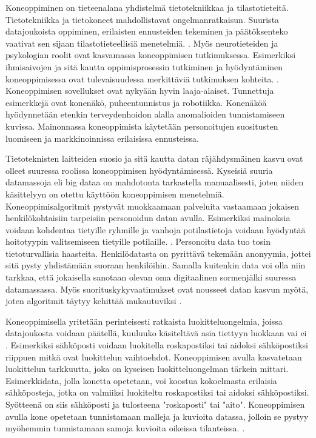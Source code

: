 \documentclass[utf8]{gradu3}
\begin{document}
Koneoppiminen on tieteenalana yhdistelmä tietotekniikkaa ja tilastotieteitä. Tietotekniikka ja tietokoneet mahdollistavat ongelmanratkaisun. Suurista datajoukoista oppiminen, erilaisten ennusteiden tekeminen ja päätöksenteko vaativat sen sijaan tilastotieteellisiä menetelmiä. \parencite{das2017survey,jordan2015machine}. Myös neurotieteiden ja psykologian roolit ovat kasvamassa koneoppimisen tutkimuksessa. Esimerkiksi ihmisaivojen ja sitä kautta oppimisprosessin tutkiminen ja hyödyntäminen koneoppimisessa ovat tulevaisuudessa merkittäviä tutkimuksen kohteita. \parencite{das2017survey}. Koneoppimisen sovellukset ovat nykyään hyvin laaja-alaiset. Tunnettuja esimerkkejä ovat konenäkö, puheentunnistus ja robotiikka. Konenäköä hyödynnetään etenkin terveydenhoidon alalla anomalioiden tunnistamiseen kuvissa. Mainonnassa koneoppimista käytetään personoitujen suositusten luomiseen ja markkinoinnissa erilaisissa ennusteissa.

Tietoteknisten laitteiden suosio ja sitä kautta datan räjähdysmäinen kasvu ovat olleet suuressa roolissa koneoppimisen hyödyntämisessä. Kyseisiä suuria datamassoja eli big dataa on mahdotonta tarkastella manuaalisesti, joten niiden käsittelyyn on otettu käyttöön koneoppimisen menetelmiä. Koneoppimisalgoritmit pystyvät muokkaamaan palveluita vastaamaan jokaisen henkilökohtaisiin tarpeisiin personoidun datan avulla. Esimerkiksi mainoksia voidaan kohdentaa tietyille ryhmille ja vanhoja potilastietoja voidaan hyödyntää hoitotyypin valitsemiseen tietyille potilaille. \parencite{jordan2015machine}. Personoitu data tuo tosin tietoturvallisia haasteita. Henkilödatasta on pyrittävä tekemään anonyymia, jottei sitä pysty yhdistämään suoraan henkilöihin. Samalla kuitenkin data voi olla niin tarkkaa, että jokaisella sanotaan olevan oma digitaalinen sormenjälki suuressa datamassassa. Myös suorituskykyvaatimukset ovat nousseet datan kasvun myötä, joten algoritmit täytyy kehittää mukautuviksi \parencite{jordan2015machine}.

Koneoppimisella yritetään perinteisesti ratkaista luokitteluongelmia, joissa datajoukosta voidaan päätellä, kuuluuko käsiteltävä asia tiettyyn luokkaan vai ei \parencite{jordan2015machine}. Esimerkiksi sähköposti voidaan luokitella roskapostiksi tai aidoksi sähköpostiksi riippuen mitkä ovat luokittelun vaihtoehdot. Koneoppimisen avulla kasvatetaan luokittelun tarkkuutta, joka on kyseisen luokitteluongelman tärkein mittari. Esimerkkidata, jolla konetta opetetaan, voi koostua kokoelmasta erilaisia sähköposteja, jotka on valmiiksi luokiteltu roskapostiksi tai aidoksi sähköpostiksi. Syötteenä on siis sähköposti ja tulosteena "roskaposti" tai "aito". Koneoppimisen avulla kone opetetaan tunnistamaan malleja ja kuvioita datassa, jolloin se pystyy myöhemmin tunnistamaan samoja kuvioita oikeissa tilanteissa. \parencite{jordan2015machine}.
\end{document}
